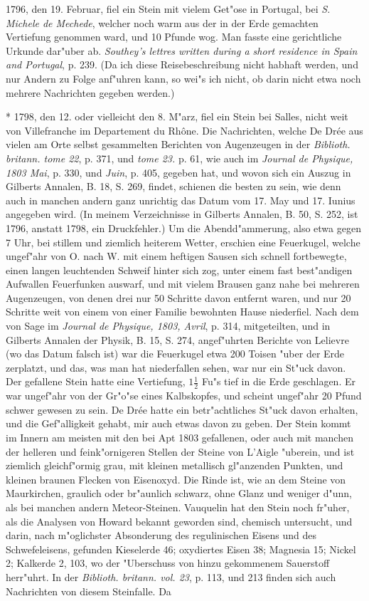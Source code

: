 \documentclass[a4paper, 11pt, oneside, polutonikogreek, german]{article}
\begin{document}
1796, den 19. Februar, fiel ein Stein mit vielem Get"ose in Portugal, bei \emph{S. Michele de Mechede}, welcher noch warm aus der in der Erde gemachten Vertiefung genommen ward, und 10 Pfunde wog. Man fasste eine gerichtliche Urkunde dar"uber ab. \emph{Southey's lettres written during a short residence in Spain and Portugal}, p. 239. (Da ich diese Reisebeschreibung nicht habhaft werden, und nur Andern zu Folge anf"uhren kann, so wei"s ich nicht, ob darin nicht etwa noch mehrere Nachrichten gegeben werden.)

* 1798, den 12. oder vielleicht den 8. M"arz, fiel ein Stein bei Salles, nicht weit von Villefranche im Departement du Rhône. Die Nachrichten, welche De Drée aus vielen am Orte selbst gesammelten Berichten von Augenzeugen in der \emph{Biblioth. britann. tome 22}, p. 371, und \emph{tome 23.} p. 61, wie auch im \emph{Journal de Physique, 1803 Mai}, p. 330, und \emph{Juin}, p. 405, gegeben hat, und wovon sich ein Auszug in Gilberts Annalen, B. 18, S. 269, findet, schienen die besten zu sein, wie denn auch in manchen andern ganz unrichtig das Datum vom 17. May und 17. Iunius angegeben wird. (In meinem Verzeichnisse in Gilberts Annalen, B. 50, S. 252, ist 1796, anstatt 1798, ein Druckfehler.) Um die Abendd"ammerung, also etwa gegen 7 Uhr, bei stillem und ziemlich heiterem Wetter, erschien eine Feuerkugel, welche ungef"ahr von O. nach W. mit einem heftigen Sausen sich schnell fortbewegte, einen langen leuchtenden Schweif hinter sich zog, unter einem fast best"andigen Aufwallen Feuerfunken auswarf, und mit vielem Brausen ganz nahe bei mehreren Augenzeugen, von denen drei nur 50 Schritte davon entfernt waren, und nur 20 Schritte weit von einem von einer Familie bewohnten Hause niederfiel. Nach dem von Sage im \emph{Journal de Physique, 1803, Avril}, p. 314, mitgeteilten, und in Gilberts Annalen der Physik, B. 15, S. 274, angef"uhrten Berichte von Lelievre (wo das Datum falsch ist) war die Feuerkugel etwa 200 Toisen "uber der Erde zerplatzt, und das, was man hat niederfallen sehen, war nur ein St"uck davon. Der gefallene Stein hatte eine Vertiefung, $\mathfrak{1\frac{1}{2}}$ Fu"s tief in die Erde geschlagen. Er war ungef"ahr von der Gr"o"se eines Kalbskopfes, und scheint ungef"ahr 20 Pfund schwer gewesen zu sein. De Drée hatte ein betr"achtliches St"uck davon erhalten, und die Gef"alligkeit gehabt, mir auch etwas davon zu geben. Der Stein kommt im Innern am meisten mit den bei Apt 1803 gefallenen, oder auch mit manchen der helleren und feink"ornigeren Stellen der Steine von L'Aigle "uberein, und ist ziemlich gleichf"ormig grau, mit kleinen metallisch gl"anzenden Punkten, und kleinen braunen Flecken von Eisenoxyd. Die Rinde ist, wie an dem Steine von Maurkirchen, graulich oder br"aunlich schwarz, ohne Glanz und weniger d"unn, als bei manchen andern Meteor-Steinen. Vauquelin hat den Stein noch fr"uher, als die Analysen von Howard bekannt geworden sind, chemisch untersucht, und darin, nach m"oglichster Absonderung des regulinischen Eisens und des Schwefeleisens, gefunden Kieselerde 46; oxydiertes Eisen 38; Magnesia 15; Nickel 2; Kalkerde 2, 103, wo der "Uberschuss von hinzu gekommenem Sauerstoff herr"uhrt. In der \emph{Biblioth. britann. vol. 23}, p. 113, und 213 finden sich auch Nachrichten von diesem Steinfalle. Da 
\end{document}
